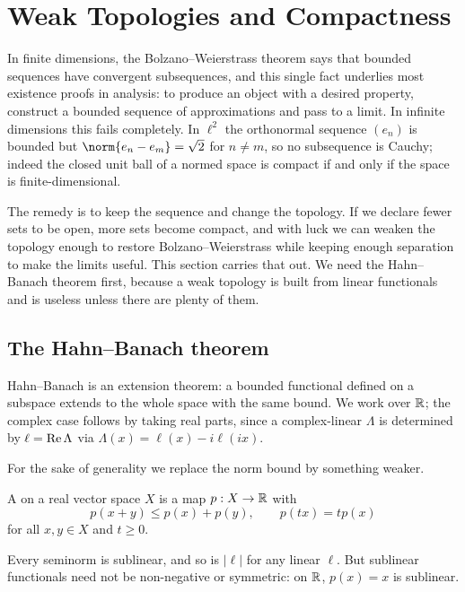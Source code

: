\documentclass[a4paper]{scrartcl}
\begin{document}
\section{Weak Topologies and Compactness}\label{sec:weak}

In finite dimensions, the Bolzano--Weierstrass theorem says that bounded sequences have convergent subsequences, and this single fact underlies most existence proofs in analysis: to produce an object with a desired property, construct a bounded sequence of approximations and pass to a limit. In infinite dimensions this fails completely. In $\ell^2$ the orthonormal sequence $(e_n)$ is bounded but $\norm{e_n - e_m} = \sqrt 2$ for $n \ne m$, so no subsequence is Cauchy; indeed the closed unit ball of a normed space is compact if and only if the space is finite-dimensional.

The remedy is to keep the sequence and change the topology. If we declare fewer sets to be open, more sets become compact, and with luck we can weaken the topology enough to restore Bolzano--Weierstrass while keeping enough separation to make the limits useful. This section carries that out. We need the Hahn--Banach theorem first, because a weak topology is built from linear functionals and is useless unless there are plenty of them.

\subsection{The Hahn--Banach theorem}

Hahn--Banach is an extension theorem: a bounded functional defined on a subspace extends to the whole space with the same bound. We work over $\mathbb{R}$; the complex case follows by taking real parts, since a complex-linear $\Lambda$ is determined by $\ell = \operatorname{Re} \Lambda$ via $\Lambda(x) = \ell(x) - i \ell(ix)$.

For the sake of generality we replace the norm bound by something weaker.

\begin{definition}
	A  on a real vector space $X$ is a map $p : X \to \mathbb{R}$ with
	$$p(x+y) \le p(x) + p(y), \qquad p(tx) = tp(x)$$
	for all $x,y \in X$ and $t \ge 0$.
\end{definition}

\begin{example}
	Every seminorm is sublinear, and so is $|\ell|$ for any linear $\ell$. But sublinear functionals need not be non-negative or symmetric: on $\mathbb{R}$, $p(x) = x$ is sublinear.
\end{example}
\end{document}
